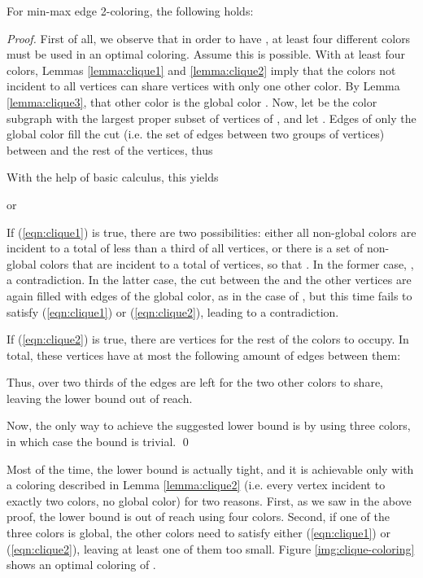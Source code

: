 \documentclass[runningheads, a4paper]{llncs}
\begin{document}
\begin{theorem}\label{theorem:clique}
For min-max edge 2-coloring, the following holds:

\end{theorem}
\begin{proof}
First of all, we observe that in order to have , at least four different colors must be used in an optimal coloring. Assume this is possible. With at least four colors, Lemmas \ref{lemma:clique1} and \ref{lemma:clique2} imply that the colors not incident to all vertices can share vertices with only one other color. By Lemma \ref{lemma:clique3}, that other color is the global color . Now, let  be the color subgraph with the largest proper subset of vertices of , and let . Edges of only the global color fill the cut (i.e. the set of edges between two groups of vertices) between  and the rest of the  vertices, thus

With the help of basic calculus, this yields

or

If (\ref{eqn:clique1}) is true, there are two possibilities: either all non-global colors are incident to a total of less than a third of all vertices, or there is a set of non-global colors that are incident to a total of  vertices, so that . In the former case, , a contradiction. In the latter case, the cut between the  and the other  vertices are again filled with edges of the global color, as in the case of , but this time  fails to satisfy (\ref{eqn:clique1}) or (\ref{eqn:clique2}), leading to a contradiction.

If (\ref{eqn:clique2}) is true, there are  vertices for the rest of the colors to occupy. In total, these vertices have at most the following amount of edges between them:

Thus, over two thirds of the edges are left for the two other colors to share, leaving the lower bound out of reach.

Now, the only way to achieve the suggested lower bound is by using three colors, in which case the bound is trivial. \qed
\end{proof}

Most of the time, the lower bound is actually tight, and it is achievable only with a coloring described in Lemma \ref{lemma:clique2} (i.e. every vertex incident to exactly two colors, no global color) for two reasons. First, as we saw in the above proof, the lower bound is out of reach using four colors. Second, if one of the three colors is global, the other colors need to satisfy either (\ref{eqn:clique1}) or (\ref{eqn:clique2}), leaving at least one of them too small. Figure \ref{img:clique-coloring} shows an optimal coloring of .
\end{document}
